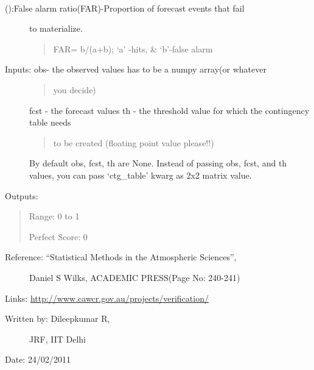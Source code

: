 \documentclass[letterpaper,10pt,english]{sphinxmanual}
\begin{document}

\begin{fulllineitems}
\label{diagnosis:ctgfunction.far}~\begin{description}
\item[{{\hyperref[diagnosis:ctgfunction.far]{}} ():False alarm ratio(FAR)-Proportion of forecast events that fail}] \leavevmode
to materialize.
\begin{quote}

FAR= b/(a+b); `a' -hits, \& `b'-false alarm
\end{quote}

\item[{Inputs: obs- the observed values has to be a numpy array(or whatever}] \leavevmode\begin{quote}

you decide)
\end{quote}

fcst - the forecast values
th  - the threshold value for which the contingency table needs
\begin{quote}

to be created (floating point value please!!)
\end{quote}

By default obs, fcst, th are None. Instead of passing obs, fcst,
and th values, you can pass `ctg\_table' kwarg as 2x2 matrix value.

\end{description}

Outputs:
\begin{quote}

Range: 0 to 1

Perfect Score: 0
\end{quote}
\begin{description}
\item[{Reference: ``Statistical Methods in the Atmospheric Sciences'',}] \leavevmode
Daniel S Wilks, ACADEMIC PRESS(Page No: 240-241)

\end{description}

Links: \href{http://www.cawcr.gov.au/projects/verification/}{http://www.cawcr.gov.au/projects/verification/}
\begin{description}
\item[{Written by: Dileepkumar R,}] \leavevmode
JRF, IIT Delhi

\end{description}

Date: 24/02/2011

\end{fulllineitems}
\end{document}
